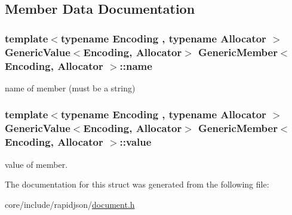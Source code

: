 \subsection{Member Data Documentation}
\subsubsection[{\texorpdfstring{name}{name}}]{\setlength{\rightskip}{0pt plus 5cm}template$<$typename Encoding , typename Allocator $>$ {\bf Generic\+Value}$<$Encoding, Allocator$>$ {\bf Generic\+Member}$<$ Encoding, Allocator $>$\+::name}\hypertarget{structGenericMember_a7124f7ccd67421533d33139938604fac}{}\label{structGenericMember_a7124f7ccd67421533d33139938604fac}


name of member (must be a string) 

\subsubsection[{\texorpdfstring{value}{value}}]{\setlength{\rightskip}{0pt plus 5cm}template$<$typename Encoding , typename Allocator $>$ {\bf Generic\+Value}$<$Encoding, Allocator$>$ {\bf Generic\+Member}$<$ Encoding, Allocator $>$\+::value}\hypertarget{structGenericMember_aad3cfa4f9e8b9018068c8bc865723083}{}\label{structGenericMember_aad3cfa4f9e8b9018068c8bc865723083}


value of member. 



The documentation for this struct was generated from the following file\+:\begin{DoxyCompactItemize}
\item 
core/include/rapidjson/\hyperlink{document_8h}{document.\+h}\end{DoxyCompactItemize}
